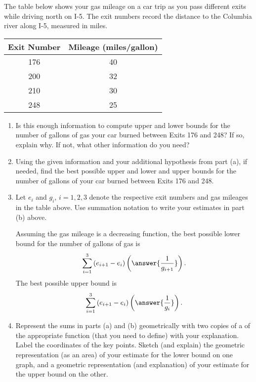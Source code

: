 \documentclass{ximera}
\begin{document}
\begin{exercise}  \label{ExY6r3erMMdvb}

The table below shows your gas mileage on a car trip as you pass different exits while driving north on I-5. The exit numbers record the distance to the Columbia river along I-5, measured in miles.


\begin{tabular}{|c|c|}
\hline
Exit Number & Mileage (miles/gallon) \\
\hline
176 & 40 \\  \hline
200 & 32 \\ \hline
210 & 30 \\ \hline
248 & 25 \\
\hline
\end{tabular}

\begin{enumerate}

\item Is this enough information to compute upper and lower bounds for the number of gallons of gas your car burned between Exits 176 and 248? If so, explain why. If not, what other information do you need?

\item Using the given information and your additional hypothesis from part (a), if needed, find the best possible upper and lower and upper bounds for the number of gallons of your car burned between Exits 176 and 248. 

\item Let $e_i$ and $g_i$, $i=1,2,3$ denote the respective exit numbers and gas mileages in the table above. Use summation notation to write your estimates in part (b) above.

Assuming the gas mileage is a decreasing function, the best possible lower bound for the number of gallons of gas is
\[
  \sum_{i=1}^3 \left( e_{i+1} - e_{i}  \right)\left( \answer{\frac{1}{g_{i+1}}}  \right) .
\]
The best possible upper bound is
\[
  \sum_{i=1}^3 \left( e_{i+1} - e_{i}  \right)\left( \answer{\frac{1}{g_{i}}}  \right) .
\]


\item Represent the sums in parts (a) and (b) geometrically with two copies of a of the appropriate function (that you need to define) with your explanation. Label the coordinates of the key points. Sketch (and explain) the geometric representation (as an area) of your estimate for the lower bound on one graph, and a geometric representation (and explanation) of your estimate for the upper bound on the other. 

\end{enumerate}
\end{exercise}
\end{document}
